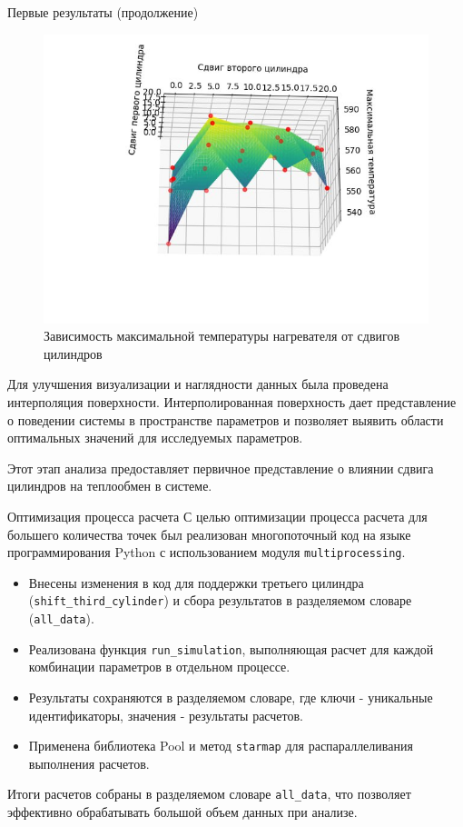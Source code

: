 \documentclass{beamer}
\begin{document}
\begin{frame}{Первые результаты (продолжение)}
	\begin{figure}[h]
		\centering
		\includegraphics[width=0.4\linewidth]{16.3.jpg}
		\caption{Зависимость максимальной температуры нагревателя от сдвигов цилиндров}
	\end{figure}

	\vspace{1em}
	Для улучшения визуализации и наглядности данных была проведена интерполяция поверхности. Интерполированная поверхность дает представление о поведении системы в пространстве параметров и позволяет выявить области оптимальных значений для исследуемых параметров.

	\vspace{1em}
	Этот этап анализа предоставляет первичное представление о влиянии сдвига цилиндров на теплообмен в системе.
\end{frame}

\begin{frame}{Оптимизация процесса расчета}
	С целью оптимизации процесса расчета для большего количества точек был реализован многопоточный код на языке программирования Python с использованием модуля \texttt{multiprocessing}.

	\vspace{1em}
	\begin{itemize}
		\item Внесены изменения в код для поддержки третьего цилиндра (\texttt{shift\_third\_cylinder}) и сбора результатов в разделяемом словаре (\texttt{all\_data}).
		\item Реализована функция \texttt{run\_simulation}, выполняющая расчет для каждой комбинации параметров в отдельном процессе.
		\item Результаты сохраняются в разделяемом словаре, где ключи - уникальные идентификаторы, значения - результаты расчетов.
		\item Применена библиотека Pool и метод \texttt{starmap} для распараллеливания выполнения расчетов.
	\end{itemize}

	\vspace{1em}
	Итоги расчетов собраны в разделяемом словаре \texttt{all\_data}, что позволяет эффективно обрабатывать большой объем данных при анализе.
\end{frame}
\end{document}
